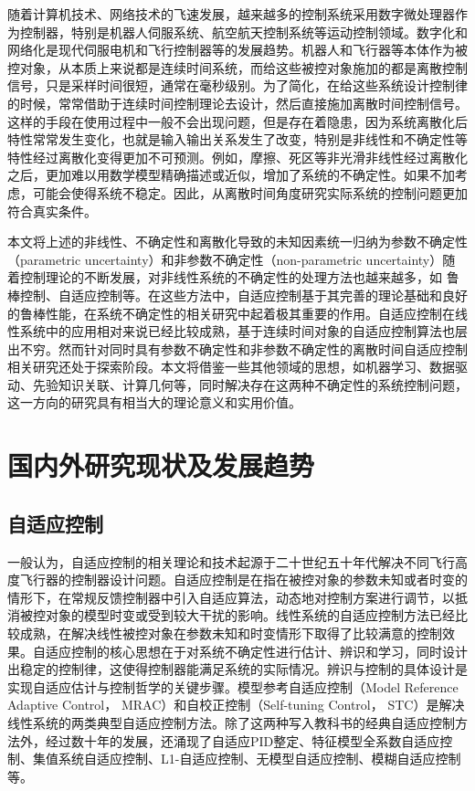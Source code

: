 随着计算机技术、网络技术的飞速发展，越来越多的控制系统采用数字微处理器作为控制器，特别是机器人伺服系统、航空航天控制系统等运动控制领域。数字化和网络化是现代伺服电机和飞行控制器等的发展趋势。机器人和飞行器等本体作为被控对象，从本质上来说都是连续时间系统，而给这些被控对象施加的都是离散控制信号，只是采样时间很短，通常在毫秒级别。为了简化，在给这些系统设计控制律的时候，常常借助于连续时间控制理论去设计，然后直接施加离散时间控制信号。这样的手段在使用过程中一般不会出现问题，但是存在着隐患，因为系统离散化后特性常常发生变化，也就是输入输出关系发生了改变，特别是非线性和不确定性等特性经过离散化变得更加不可预测。例如，摩擦、死区等非光滑非线性经过离散化之后，更加难以用数学模型精确描述或近似，增加了系统的不确定性。如果不加考虑，可能会使得系统不稳定。因此，从离散时间角度研究实际系统的控制问题更加符合真实条件。

本文将上述的非线性、不确定性和离散化导致的未知因素统一归纳为参数不确定性（parametric uncertainty）和非参数不确定性（non-parametric uncertainty）随着控制理论的不断发展，对非线性系统的不确定性的处理方法也越来越多，如 鲁棒控制、自适应控制等。在这些方法中，自适应控制基于其完善的理论基础和良好的鲁棒性能，在系统不确定性的相关研究中起着极其重要的作用。自适应控制在线性系统中的应用相对来说已经比较成熟，基于连续时间对象的自适应控制算法也层出不穷。然而针对同时具有参数不确定性和非参数不确定性的离散时间自适应控制相关研究还处于探索阶段。本文将借鉴一些其他领域的思想，如机器学习、数据驱动、先验知识关联、计算几何等，同时解决存在这两种不确定性的系统控制问题，这一方向的研究具有相当大的理论意义和实用价值。

\section{国内外研究现状及发展趋势}\label{sect:1.2}

\subsection{自适应控制}%

一般认为，自适应控制的相关理论和技术起源于二十世纪五十年代解决不同飞行高度飞行器的控制器设计问题。自适应控制是在指在被控对象的参数未知或者时变的情形下，在常规反馈控制器中引入自适应算法，动态地对控制方案进行调节，以抵消被控对象的模型时变或受到较大干扰的影响。线性系统的自适应控制方法已经比较成熟，在解决线性被控对象在参数未知和时变情形下取得了比较满意的控制效果。自适应控制的核心思想在于对系统不确定性进行估计、辨识和学习，同时设计出稳定的控制律，这使得控制器能满足系统的实际情况。辨识与控制的具体设计是实现自适应估计与控制哲学的关键步骤。模型参考自适应控制（Model Reference Adaptive Control， MRAC）和自校正控制（Self-tuning Control， STC）是解决线性系统的两类典型自适应控制方法。除了这两种写入教科书的经典自适应控制方法外，经过数十年的发展，还涌现了自适应PID整定、特征模型全系数自适应控制、集值系统自适应控制、L1-自适应控制、无模型自适应控制、模糊自适应控制等。

